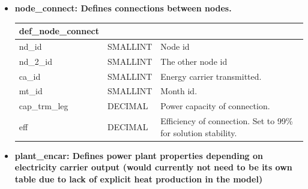 \documentclass[]{article}
\begin{document}
\begin{itemize}
\item \textbf{node\_connect: Defines connections between nodes.}

\begin{tabular}{@{}lll@{}}
\toprule
def\_node\_connect & &
\\
\midrule
nd\_id & SMALLINT & Node id
\\
nd\_2\_id & SMALLINT & The other node id
\\
ca\_id & SMALLINT & Energy carrier transmitted.
\\
mt\_id & SMALLINT & Month id.
\\
cap\_trm\_leg & DECIMAL & Power capacity of connection.
\\
eff & DECIMAL & Efficiency of connection. Set to 99\% for solution
stability.
\\
\bottomrule
\end{tabular}

\item \textbf{plant\_encar: Defines power plant properties depending on
electricity carrier output (would currently not need to be its own table
due to lack of explicit heat production in the model)}


\end{itemize}
\end{document}

